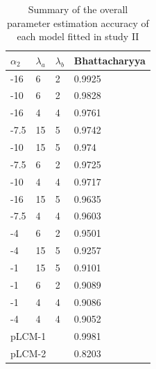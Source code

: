 \documentclass[11 pt, a4paper]{article}  %
\begin{document}
\begin{table}[]
\centering
\caption{Summary of the overall parameter estimation accuracy of each model fitted in study II}
\label{tab:result2}
\begin{tabular}{llll}
\hline
$\alpha_2$ & $\lambda_a$ & $\lambda_b$ & Bhattacharyya \\ \hline
-16        & 6           & 2           & 0.9925        \\
-10        & 6           & 2           & 0.9828        \\
-16        & 4           & 4           & 0.9761        \\
-7.5       & 15          & 5           & 0.9742        \\
-10        & 15          & 5           & 0.974         \\
-7.5       & 6           & 2           & 0.9725        \\
-10        & 4           & 4           & 0.9717        \\
-16        & 15          & 5           & 0.9635        \\
-7.5       & 4           & 4           & 0.9603        \\
-4         & 6           & 2           & 0.9501        \\
-4         & 15          & 5           & 0.9257        \\
-1         & 15          & 5           & 0.9101        \\
-1         & 6           & 2           & 0.9089        \\
-1         & 4           & 4           & 0.9086        \\
-4         & 4           & 4           & 0.9052        \\ \hline
\multicolumn{3}{l}{pLCM-1}             & 0.9981        \\
\multicolumn{3}{l}{pLCM-2}             & 0.8203        \\ \hline
\end{tabular}
\end{table}
\end{document}
